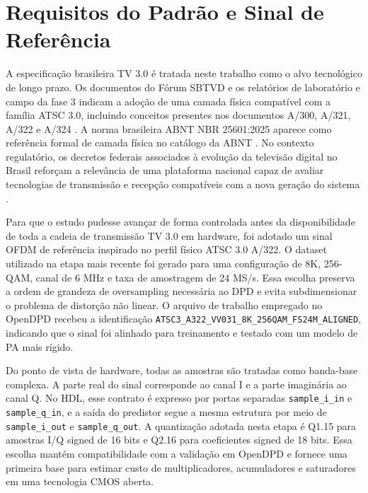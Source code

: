 \documentclass[journal,comsoc]{IEEEtran}
\begin{document}
\section{Requisitos do Padrão e Sinal de Referência}
A especificação brasileira TV 3.0 é tratada neste trabalho como o alvo tecnológico de longo prazo. Os documentos do Fórum SBTVD e os relatórios de laboratório e campo da fase 3 indicam a adoção de uma camada física compatível com a família ATSC 3.0, incluindo conceitos presentes nos documentos A/300, A/321, A/322 e A/324 \cite{sbtvd_og01_physical_layer_2026,sbtvd_tv30_p3_pl_lab_report_2023,sbtvd_tv30_p3_pl_field_report_2024,atsc_a300_2024,atsc_a321_2024,atsc_a322_2024,atsc_a324_2024}. A norma brasileira ABNT NBR 25601:2025 aparece como referência formal de camada física no catálogo da ABNT \cite{abnt_nbr_25601_catalogo}. No contexto regulatório, os decretos federais associados à evolução da televisão digital no Brasil reforçam a relevância de uma plataforma nacional capaz de avaliar tecnologias de transmissão e recepção compatíveis com a nova geração do sistema \cite{planalto_decreto_11484_2023,planalto_decreto_12595_2025}.

Para que o estudo pudesse avançar de forma controlada antes da disponibilidade de toda a cadeia de transmissão TV 3.0 em hardware, foi adotado um sinal OFDM de referência inspirado no perfil físico ATSC 3.0 A/322. O dataset utilizado na etapa mais recente foi gerado para uma configuração de 8K, 256-QAM, canal de 6 MHz e taxa de amostragem de 24 MS/s. Essa escolha preserva a ordem de grandeza de oversampling necessária ao DPD e evita subdimensionar o problema de distorção não linear. O arquivo de trabalho empregado no OpenDPD recebeu a identificação \texttt{ATSC3\_A322\_VV031\_8K\_256QAM\_FS24M\_ALIGNED}, indicando que o sinal foi alinhado para treinamento e testado com um modelo de PA mais rígido.

Do ponto de vista de hardware, todas as amostras são tratadas como banda-base complexa. A parte real do sinal corresponde ao canal I e a parte imaginária ao canal Q. No HDL, esse contrato é expresso por portas separadas \texttt{sample\_i\_in} e \texttt{sample\_q\_in}, e a saída do predistor segue a mesma estrutura por meio de \texttt{sample\_i\_out} e \texttt{sample\_q\_out}. A quantização adotada nesta etapa é Q1.15 para amostras I/Q signed de 16 bits e Q2.16 para coeficientes signed de 18 bits. Essa escolha mantém compatibilidade com a validação em OpenDPD e fornece uma primeira base para estimar custo de multiplicadores, acumuladores e saturadores em uma tecnologia CMOS aberta.
\end{document}
